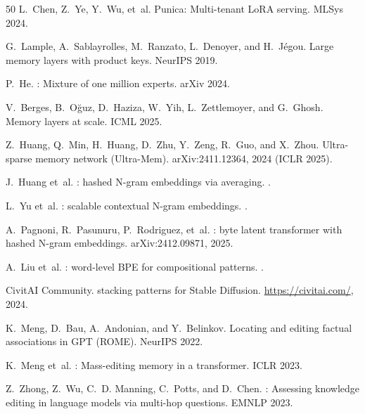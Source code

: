 \documentclass[11pt]{article}
\begin{document}
\begin{thebibliography}{50}
L.~Chen, Z.~Ye, Y.~Wu, et~al.
\newblock Punica: Multi-tenant {LoRA} serving.
\newblock MLSys 2024.

G.~Lample, A.~Sablayrolles, M.~Ranzato, L.~Denoyer, and H.~J\'egou.
\newblock Large memory layers with product keys.
\newblock NeurIPS 2019.

P.~He.
: Mixture of one million experts.
\newblock arXiv 2024.

V.~Berges, B.~O\u{g}uz, D.~Haziza, W.~Yih, L.~Zettlemoyer, and G.~Ghosh.
\newblock Memory layers at scale.
\newblock ICML 2025.

Z.~Huang, Q.~Min, H.~Huang, D.~Zhu, Y.~Zeng, R.~Guo, and X.~Zhou.
\newblock Ultra-sparse memory network ({Ultra-Mem}).
\newblock arXiv:2411.12364, 2024 (ICLR 2025).

J.~Huang et~al.
: hashed N-gram embeddings via averaging.
.

L.~Yu et~al.
: scalable contextual N-gram embeddings.
.

A.~Pagnoni, R.~Pasunuru, P.~Rodriguez, et~al.
: byte latent transformer with hashed N-gram embeddings.
\newblock arXiv:2412.09871, 2025.

A.~Liu et~al.
: word-level BPE for compositional patterns.
.

{CivitAI Community}.
 stacking patterns for Stable Diffusion.
\newblock \url{https://civitai.com/}, 2024.

K.~Meng, D.~Bau, A.~Andonian, and Y.~Belinkov.
\newblock Locating and editing factual associations in {GPT} ({ROME}).
\newblock NeurIPS 2022.

K.~Meng et~al.
: Mass-editing memory in a transformer.
\newblock ICLR 2023.

Z.~Zhong, Z.~Wu, C.~D. Manning, C.~Potts, and D.~Chen.
: Assessing knowledge editing in language models via
  multi-hop questions.
\newblock EMNLP 2023.


\end{thebibliography}
\end{document}
